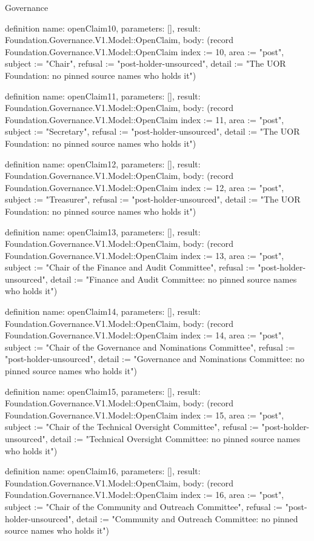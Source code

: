 \begin{lexlean}{Governance}
\begin{semanticmodule}
definition{
  name: openClaim10,
  parameters: [],
  result: Foundation.Governance.V1.Model::OpenClaim,
  body: (record Foundation.Governance.V1.Model::OpenClaim {index := 10, area := "post", subject := "Chair", refusal := "post-holder-unsourced", detail := "The UOR Foundation: no pinned source names who holds it"})
}

definition{
  name: openClaim11,
  parameters: [],
  result: Foundation.Governance.V1.Model::OpenClaim,
  body: (record Foundation.Governance.V1.Model::OpenClaim {index := 11, area := "post", subject := "Secretary", refusal := "post-holder-unsourced", detail := "The UOR Foundation: no pinned source names who holds it"})
}

definition{
  name: openClaim12,
  parameters: [],
  result: Foundation.Governance.V1.Model::OpenClaim,
  body: (record Foundation.Governance.V1.Model::OpenClaim {index := 12, area := "post", subject := "Treasurer", refusal := "post-holder-unsourced", detail := "The UOR Foundation: no pinned source names who holds it"})
}

definition{
  name: openClaim13,
  parameters: [],
  result: Foundation.Governance.V1.Model::OpenClaim,
  body: (record Foundation.Governance.V1.Model::OpenClaim {index := 13, area := "post", subject := "Chair of the Finance and Audit Committee", refusal := "post-holder-unsourced", detail := "Finance and Audit Committee: no pinned source names who holds it"})
}

definition{
  name: openClaim14,
  parameters: [],
  result: Foundation.Governance.V1.Model::OpenClaim,
  body: (record Foundation.Governance.V1.Model::OpenClaim {index := 14, area := "post", subject := "Chair of the Governance and Nominations Committee", refusal := "post-holder-unsourced", detail := "Governance and Nominations Committee: no pinned source names who holds it"})
}

definition{
  name: openClaim15,
  parameters: [],
  result: Foundation.Governance.V1.Model::OpenClaim,
  body: (record Foundation.Governance.V1.Model::OpenClaim {index := 15, area := "post", subject := "Chair of the Technical Oversight Committee", refusal := "post-holder-unsourced", detail := "Technical Oversight Committee: no pinned source names who holds it"})
}

definition{
  name: openClaim16,
  parameters: [],
  result: Foundation.Governance.V1.Model::OpenClaim,
  body: (record Foundation.Governance.V1.Model::OpenClaim {index := 16, area := "post", subject := "Chair of the Community and Outreach Committee", refusal := "post-holder-unsourced", detail := "Community and Outreach Committee: no pinned source names who holds it"})
}


\end{semanticmodule}
\end{lexlean}
